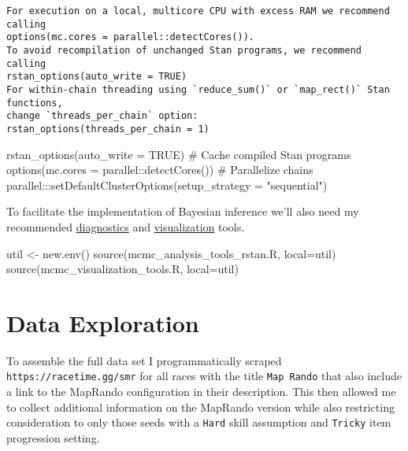 \documentclass[
  letterpaper,
  DIV=11,
  numbers=noendperiod]{scrartcl}
\newenvironment{Shaded}{\begin{snugshade}}{\end{snugshade}}
\newcommand{\AttributeTok}[1]{\textcolor[rgb]{0.40,0.45,0.13}{#1}}
\newcommand{\CommentTok}[1]{\textcolor[rgb]{0.37,0.37,0.37}{#1}}
\newcommand{\ConstantTok}[1]{\textcolor[rgb]{0.56,0.35,0.01}{#1}}
\newcommand{\FunctionTok}[1]{\textcolor[rgb]{0.28,0.35,0.67}{#1}}
\newcommand{\NormalTok}[1]{\textcolor[rgb]{0.00,0.23,0.31}{#1}}
\newcommand{\OtherTok}[1]{\textcolor[rgb]{0.00,0.23,0.31}{#1}}
\newcommand{\SpecialCharTok}[1]{\textcolor[rgb]{0.37,0.37,0.37}{#1}}
\newcommand{\StringTok}[1]{\textcolor[rgb]{0.13,0.47,0.30}{#1}}
\begin{document}
\begin{verbatim}
For execution on a local, multicore CPU with excess RAM we recommend calling
options(mc.cores = parallel::detectCores()).
To avoid recompilation of unchanged Stan programs, we recommend calling
rstan_options(auto_write = TRUE)
For within-chain threading using `reduce_sum()` or `map_rect()` Stan functions,
change `threads_per_chain` option:
rstan_options(threads_per_chain = 1)
\end{verbatim}

\begin{Shaded}
\begin{Highlighting}[]
\FunctionTok{rstan\_options}\NormalTok{(}\AttributeTok{auto\_write =} \ConstantTok{TRUE}\NormalTok{)            }\CommentTok{\# Cache compiled Stan programs}
\FunctionTok{options}\NormalTok{(}\AttributeTok{mc.cores =}\NormalTok{ parallel}\SpecialCharTok{::}\FunctionTok{detectCores}\NormalTok{()) }\CommentTok{\# Parallelize chains}
\NormalTok{parallel}\SpecialCharTok{:::}\FunctionTok{setDefaultClusterOptions}\NormalTok{(}\AttributeTok{setup\_strategy =} \StringTok{"sequential"}\NormalTok{)}
\end{Highlighting}
\end{Shaded}

To facilitate the implementation of Bayesian inference we'll also need
my recommended
\href{https://github.com/betanalpha/mcmc_diagnostics}{diagnostics} and
\href{https://github.com/betanalpha/mcmc_visualization_tools}{visualization}
tools.

\begin{Shaded}
\begin{Highlighting}[]
\NormalTok{util }\OtherTok{\textless{}{-}} \FunctionTok{new.env}\NormalTok{()}
\FunctionTok{source}\NormalTok{(}\StringTok{\textquotesingle{}mcmc\_analysis\_tools\_rstan.R\textquotesingle{}}\NormalTok{, }\AttributeTok{local=}\NormalTok{util)}
\FunctionTok{source}\NormalTok{(}\StringTok{\textquotesingle{}mcmc\_visualization\_tools.R\textquotesingle{}}\NormalTok{, }\AttributeTok{local=}\NormalTok{util)}
\end{Highlighting}
\end{Shaded}

\section{Data Exploration}\label{data-exploration}

To assemble the full data set I programmatically scraped
\texttt{https://racetime.gg/smr} for all races with the title
\texttt{Map\ Rando} that also include a link to the MapRando
configuration in their description. This then allowed me to collect
additional information on the MapRando version while also restricting
consideration to only those seeds with a \texttt{Hard} skill assumption
and \texttt{Tricky} item progression setting.
\end{document}
